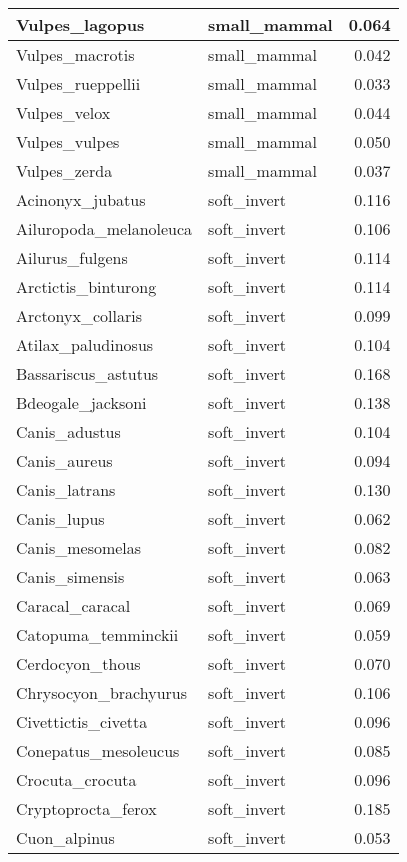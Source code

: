 \begin{table}
\begin{tabular}[t]{l|l|r}
\hline
Vulpes\_lagopus & small\_mammal & 0.064\\
\hline
Vulpes\_macrotis & small\_mammal & 0.042\\
\hline
Vulpes\_rueppellii & small\_mammal & 0.033\\
\hline
Vulpes\_velox & small\_mammal & 0.044\\
\hline
Vulpes\_vulpes & small\_mammal & 0.050\\
\hline
Vulpes\_zerda & small\_mammal & 0.037\\
\hline
Acinonyx\_jubatus & soft\_invert & 0.116\\
\hline
Ailuropoda\_melanoleuca & soft\_invert & 0.106\\
\hline
Ailurus\_fulgens & soft\_invert & 0.114\\
\hline
Arctictis\_binturong & soft\_invert & 0.114\\
\hline
Arctonyx\_collaris & soft\_invert & 0.099\\
\hline
Atilax\_paludinosus & soft\_invert & 0.104\\
\hline
Bassariscus\_astutus & soft\_invert & 0.168\\
\hline
Bdeogale\_jacksoni & soft\_invert & 0.138\\
\hline
Canis\_adustus & soft\_invert & 0.104\\
\hline
Canis\_aureus & soft\_invert & 0.094\\
\hline
Canis\_latrans & soft\_invert & 0.130\\
\hline
Canis\_lupus & soft\_invert & 0.062\\
\hline
Canis\_mesomelas & soft\_invert & 0.082\\
\hline
Canis\_simensis & soft\_invert & 0.063\\
\hline
Caracal\_caracal & soft\_invert & 0.069\\
\hline
Catopuma\_temminckii & soft\_invert & 0.059\\
\hline
Cerdocyon\_thous & soft\_invert & 0.070\\
\hline
Chrysocyon\_brachyurus & soft\_invert & 0.106\\
\hline
Civettictis\_civetta & soft\_invert & 0.096\\
\hline
Conepatus\_mesoleucus & soft\_invert & 0.085\\
\hline
Crocuta\_crocuta & soft\_invert & 0.096\\
\hline
Cryptoprocta\_ferox & soft\_invert & 0.185\\
\hline
Cuon\_alpinus & soft\_invert & 0.053\\

\end{tabular}
\end{table}
